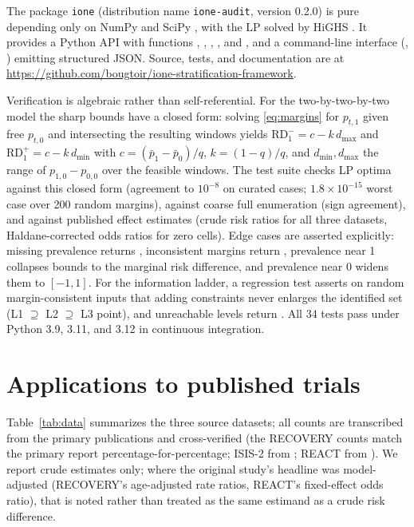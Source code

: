 \documentclass[article]{ajs}
\begin{document}
\begin{sloppypar}
The package \texttt{ione} (distribution name \texttt{ione-audit}, version
0.2.0) is pure  depending only on NumPy
\citep{numpy2020} and SciPy \citep{scipy2020}, with the LP solved by
HiGHS \citep{huangfu2018}. It provides a Python API with functions
, ,
, , and
, and a
command-line interface (, )
emitting structured JSON. Source, tests, and documentation are at
\url{https://github.com/bougtoir/ione-stratification-framework}.
\end{sloppypar}

Verification is algebraic rather than self-referential. For the
two-by-two-by-two model the sharp bounds have a closed form: solving
\eqref{eq:margins} for $p_{t,1}$ given free $p_{t,0}$ and intersecting
the resulting windows yields $\mathrm{RD}_1^- = c - k\,d_{\max}$ and
$\mathrm{RD}_1^+ = c - k\,d_{\min}$ with $c = (\bar p_1 - \bar p_0)/q$,
$k = (1-q)/q$, and $d_{\min}, d_{\max}$ the range of $p_{1,0} - p_{0,0}$
over the feasible windows. The test suite checks LP optima against this
closed form (agreement to $10^{-8}$ on curated cases; $1.8 \times
10^{-15}$ worst case over 200 random margins), against coarse full
enumeration (sign agreement), and against published effect estimates
(crude risk ratios for all three datasets, Haldane-corrected odds ratios
for zero cells). Edge cases are asserted explicitly: missing prevalence
returns , inconsistent margins return
, prevalence near 1 collapses bounds to the marginal
risk difference, and prevalence near 0 widens them to $[-1, 1]$. For the
information ladder, a regression test asserts on random margin-consistent
inputs that adding constraints never enlarges the identified set
(L1 $\supseteq$ L2 $\supseteq$ L3 point), and unreachable levels return
. All 34
tests pass under Python 3.9, 3.11, and 3.12 in continuous integration.

\section{Applications to published trials}
\label{sec:results}

Table~\ref{tab:data} summarizes the three source datasets; all counts
are transcribed from the primary publications and cross-verified (the
RECOVERY counts match the primary report \citep{recovery2021}
percentage-for-percentage; ISIS-2 from \citet{isis2_1988}; REACT from
\citet{react2020}). We report crude estimates only; where the original
study's headline was model-adjusted (RECOVERY's age-adjusted rate
ratios, REACT's fixed-effect odds ratio), that is noted rather than
treated as the same estimand as a crude risk difference.
\end{document}
